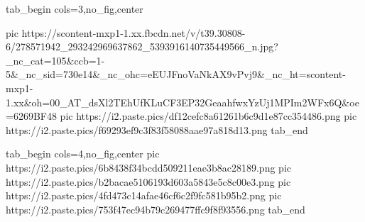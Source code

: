  
 
 
 
 


\ifcmt
  tab_begin cols=3,no_fig,center

     pic https://scontent-mxp1-1.xx.fbcdn.net/v/t39.30808-6/278571942_293242969637862_5393916140735449566_n.jpg?_nc_cat=105&ccb=1-5&_nc_sid=730e14&_nc_ohc=eEUJFnoVaNkAX9vPvj9&_nc_ht=scontent-mxp1-1.xx&oh=00_AT_dsXl2TEhUfKLuCF3EP32GeaahfwxYzUj1MPIm2WFx6Q&oe=6269BF48
		 pic https://i2.paste.pics/df12cefc8a61261b6c9d1e87cc354486.png
		 pic https://i2.paste.pics/f69293ef9c3f83f58088aae97a818d13.png
  tab_end
\fi

\ifcmt
  tab_begin cols=4,no_fig,center
     pic https://i2.paste.pics/6b8438f34bcdd509211eae3b8ac28189.png
		 pic https://i2.paste.pics/b2bacae5106193d603a5843e5c8c00e3.png
		 pic https://i2.paste.pics/4fd473c14afae46cf6c2f9fc581b95b2.png
		 pic https://i2.paste.pics/753f47ec94b79c269477ffc9f8f93556.png
  tab_end
\fi
